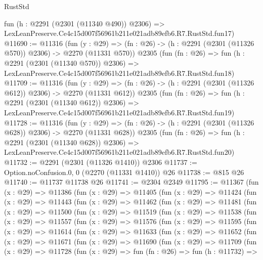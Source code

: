\begin{lexlean}{RustStd}
\begin{coremodule}
    fun (h : @2291 (@2301 (@11340 @490)) @2306) =>
    LexLeanPreserve.Ce4c15d007f56961b211e021adb89efb6.R7.RustStd.fun17)
@11690 := @11316
    (fun (y : @29) => (fn : @26) -> (h : @2291 (@2301 (@11326 @570)) @2306) -> @2270 (@11331 @570))
    @2305
    (fun (fn : @26) =>
    fun (h : @2291 (@2301 (@11340 @570)) @2306) =>
    LexLeanPreserve.Ce4c15d007f56961b211e021adb89efb6.R7.RustStd.fun18)
@11709 := @11316
    (fun (y : @29) => (fn : @26) -> (h : @2291 (@2301 (@11326 @612)) @2306) -> @2270 (@11331 @612))
    @2305
    (fun (fn : @26) =>
    fun (h : @2291 (@2301 (@11340 @612)) @2306) =>
    LexLeanPreserve.Ce4c15d007f56961b211e021adb89efb6.R7.RustStd.fun19)
@11728 := @11316
    (fun (y : @29) => (fn : @26) -> (h : @2291 (@2301 (@11326 @628)) @2306) -> @2270 (@11331 @628))
    @2305
    (fun (fn : @26) =>
    fun (h : @2291 (@2301 (@11340 @628)) @2306) =>
    LexLeanPreserve.Ce4c15d007f56961b211e021adb89efb6.R7.RustStd.fun20)
@11732 := @2291 (@2301 (@11326 @1410)) @2306
@11737 := Option.noConfusion.{0, 0} (@2270 (@11331 @1410)) @26
@11738 := @815 @26
@11740 := @11737 @11738 @26
@11741 := @2304 @2349
@11795 := @11367
    (fun (x : @29) =>
    @11386
      (fun (x : @29) =>
      @11405
        (fun (x : @29) =>
        @11424
          (fun (x : @29) =>
          @11443
            (fun (x : @29) =>
            @11462
              (fun (x : @29) =>
              @11481
                (fun (x : @29) =>
                @11500
                  (fun (x : @29) =>
                  @11519
                    (fun (x : @29) =>
                    @11538
                      (fun (x : @29) =>
                      @11557
                        (fun (x : @29) =>
                        @11576
                          (fun (x : @29) =>
                          @11595
                            (fun (x : @29) =>
                            @11614
                              (fun (x : @29) =>
                              @11633
                                (fun (x : @29) =>
                                @11652
                                  (fun (x : @29) =>
                                  @11671
                                    (fun (x : @29) =>
                                    @11690
                                      (fun (x : @29) =>
                                      @11709
                                        (fun (x : @29) =>
                                        @11728
                                          (fun (x : @29) =>
                                          fun (fn : @26) =>
                                          fun (h : @11732) =>

\end{coremodule}
\end{lexlean}
